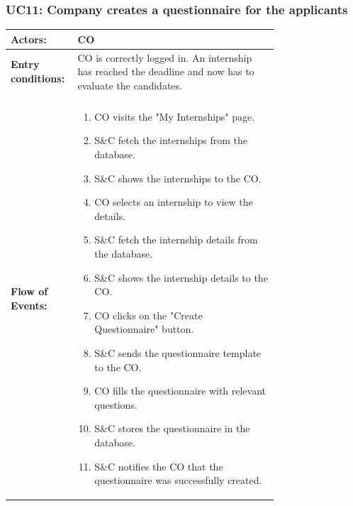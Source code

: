
\subsubsection{UC11: Company creates a questionnaire for the applicants}
\label{subsubsec:company-creates-a-questionnaire-for-the-applicants}

\begin{center}
    \begin{longtable}{|l|p{0.75\linewidth}|}
        \hline
        \textbf{Actors:}           & CO                                                                                                        \\
        \hline
        \textbf{Entry conditions:} & CO is correctly logged in. An internship has reached the deadline and now has to evaluate the candidates. \\                                                                                                  \\
        \hline
        \textbf{Flow of Events:}   & \begin{enumerate}
                                         \item CO visits the "My Internships" page.
                                         \item S\&C fetch the internships from the database.
                                         \item S\&C shows the internships to the CO.
                                         \item CO selects an internship to view the details.
                                         \item S\&C fetch the internship details from the database.
                                         \item S\&C shows the internship details to the CO.
                                         \item CO clicks on the "Create Questionnaire" button.
                                         \item S\&C sends the questionnaire template to the CO.
                                         \item CO fills the questionnaire  with relevant questions.
                                         \item S\&C stores the questionnaire in the database.
                                         \item S\&C notifies the CO that the questionnaire was successfully created.

\end{enumerate}
\end{longtable}
\end{center}
